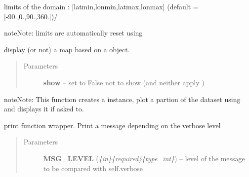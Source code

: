 \documentclass[letterpaper,10pt,english]{sphinxmanual}
\begin{document}
\begin{fulllineitems}
\begin{fulllineitems}
\end{fulllineitems}


\begin{fulllineitems}
\label{altimetry.data:altimetry.data.hydro_data.limit}
limits of the domain : {[}latmin,lonmin,latmax,lonmax{]} (default = {[}-90.,0.,90.,360.{]})/

\begin{notice}{note}{Note:}
limits are automatically reset using 
\end{notice}

\end{fulllineitems}


\begin{fulllineitems}
\label{altimetry.data:altimetry.data.hydro_data.map}
display (or not) a map based on a  object.
\begin{quote}\begin{description}
\item[{Parameters}] \leavevmode
\textbf{show} -- set to False not to show (and neither apply )

\end{description}\end{quote}

\begin{notice}{note}{Note:}
This function creates a  instance, plot a partion of the dataset using {\hyperref[altimetry.data:altimetry.data.hydro_data.plot_track]{}} and displays it if asked to.
\end{notice}

\end{fulllineitems}


\begin{fulllineitems}
\label{altimetry.data:altimetry.data.hydro_data.message}
print function wrapper. Print a message depending on the verbose level
\begin{quote}\begin{description}
\item[{Parameters}] \leavevmode
\textbf{MSG\_LEVEL} (\emph{\{in\}\{required\}\{type=int\}}) -- level of the message to be compared with self.verbose


\end{description}
\end{quote}
\end{fulllineitems}
\end{fulllineitems}
\end{document}
